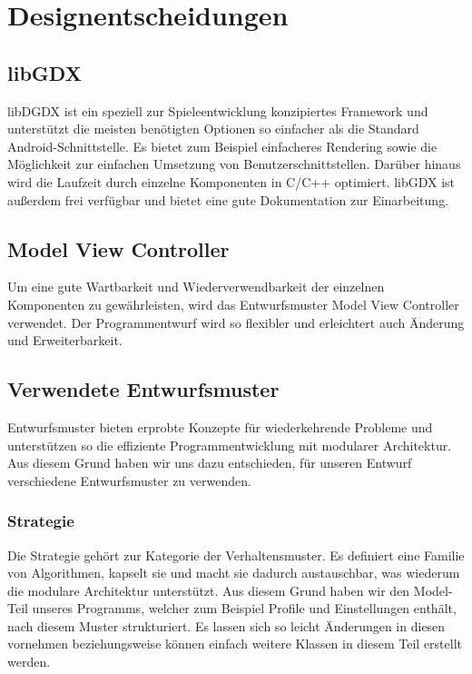 \clearpage
\chapter{Designentscheidungen}

\section{libGDX}
libDGDX ist ein speziell zur Spieleentwicklung konzipiertes Framework und unterstützt die meisten benötigten Optionen so einfacher als die Standard Android-Schnittstelle. Es bietet zum Beispiel einfacheres Rendering sowie die Möglichkeit zur einfachen Umsetzung von Benutzerschnittstellen. Darüber hinaus wird die Laufzeit durch einzelne Komponenten in C/C++ optimiert. libGDX ist außerdem frei verfügbar und bietet eine gute Dokumentation zur Einarbeitung.

\section{Model View Controller}

Um eine gute Wartbarkeit und Wiederverwendbarkeit der einzelnen Komponenten zu gewährleisten, wird das Entwurfsmuster Model View Controller verwendet. Der Programmentwurf wird so flexibler und erleichtert auch Änderung und Erweiterbarkeit. 

\section{Verwendete Entwurfsmuster}
Entwurfsmuster bieten erprobte Konzepte für wiederkehrende Probleme und unterstützen so die effiziente Programmentwicklung mit modularer Architektur. Aus diesem Grund haben wir uns dazu entschieden, für unseren Entwurf verschiedene Entwurfsmuster zu verwenden.

\subsection{Strategie}
Die Strategie gehört zur Kategorie der Verhaltensmuster. Es definiert eine Familie von Algorithmen, kapselt sie und macht sie dadurch austauschbar, was wiederum die modulare Architektur unterstützt. Aus diesem Grund haben wir den Model-Teil unseres Programms, welcher zum Beispiel Profile und Einstellungen enthält, nach diesem Muster strukturiert. Es lassen sich so leicht Änderungen in diesen vornehmen beziehungsweise können einfach weitere Klassen in diesem Teil erstellt werden.

